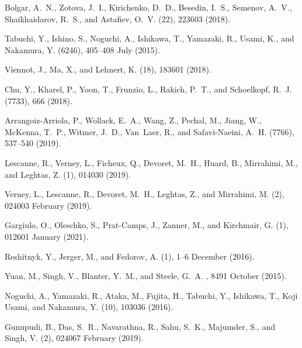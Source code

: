 \documentclass[a4paper, amsfonts, amssymb, amsmath, reprint,showkeys,nofootinbib,superscriptaddress]{revtex4-2}
\begin{document}
\begin{thebibliography}{10}
	Bolgar, A.~N., Zotova, J.~I., Kirichenko, D.~D., Besedin, I.~S., Semenov,
	A.~V., Shaikhaidarov, R.~S., and Astafiev, O.~V.
	(22), 223603 (2018).
	
	Tabuchi, Y., Ishino, S., Noguchi, A., Ishikawa, T., Yamazaki, R., Usami, K.,
	and Nakamura, Y.
	(6246), 405--408 July  (2015).
	
	Viennot, J., Ma, X., and Lehnert, K.
	(18), 183601 (2018).
	
	Chu, Y., Kharel, P., Yoon, T., Frunzio, L., Rakich, P.~T., and Schoelkopf,
	R.~J.
	(7733), 666 (2018).
	
	Arrangoiz-Arriola, P., Wollack, E.~A., Wang, Z., Pechal, M., Jiang, W.,
	McKenna, T.~P., Witmer, J.~D., Van~Laer, R., and Safavi-Naeini, A.~H.
	(7766), 537--540 (2019).
	
	Lescanne, R., Verney, L., Ficheux, Q., Devoret, M.~H., Huard, B., Mirrahimi,
	M., and Leghtas, Z.
	(1), 014030 (2019).
	
	Verney, L., Lescanne, R., Devoret, M.~H., Leghtas, Z., and Mirrahimi, M.
	(2), 024003 February  (2019).
	
	Gargiulo, O., Oleschko, S., Prat-Camps, J., Zanner, M., and Kirchmair, G.
	(1), 012601 January  (2021).
	
	Reshitnyk, Y., Jerger, M., and Fedorov, A.
	(1), 1--6 December  (2016).
	
	Yuan, M., Singh, V., Blanter, Y.~M., and Steele, G.~A.
	, 8491 October  (2015).
	
	Noguchi, A., Yamazaki, R., Ataka, M., Fujita, H., Tabuchi, Y., Ishikawa, T.,
	{Koji Usami}, and Nakamura, Y.
	(10), 103036 (2016).
	
	Gunupudi, B., Das, S.~R., Navarathna, R., Sahu, S.~K., Majumder, S., and Singh,
	V.
	(2), 024067 February  (2019).
	

\end{thebibliography}
\end{document}
